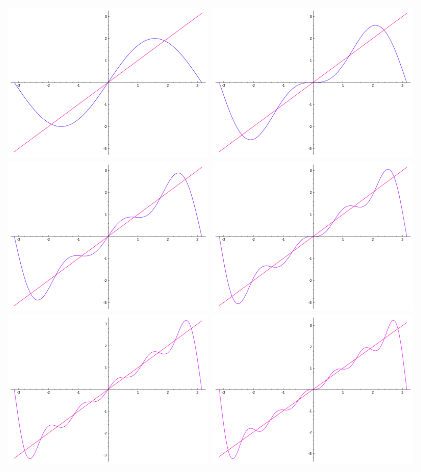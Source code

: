\begin{figure}
\label{fig:fourier-x}
\includegraphics[width=200px]{fourier-1.png}
\includegraphics[width=200px]{fourier-2.png}
\includegraphics[width=200px]{fourier-3.png}
\includegraphics[width=200px]{fourier-4.png}
\includegraphics[width=200px]{fourier-5.png}
\includegraphics[width=200px]{fourier-6.png}

\end{figure}
